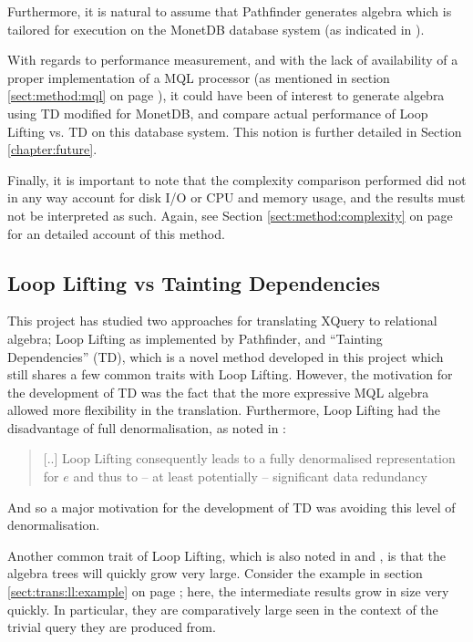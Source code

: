 Furthermore, it is natural to assume that Pathfinder generates algebra
which is tailored for execution on the MonetDB database system (as indicated
in \cite{pathfinder_purelyRelational}).

With regards to performance measurement, and with the lack of availability of a
proper implementation of a MQL processor (as mentioned in section
\ref{sect:method:mql} on page \pageref{sect:method:mql}), it could have been
of interest to generate algebra using TD modified for MonetDB, and compare
actual performance of Loop Lifting vs. TD on this database system. This notion
is further detailed in Section \ref{chapter:future}.

Finally, it is important to note that the complexity comparison performed did
not in any way account for disk I/O or CPU and memory usage, and the results
must not be interpreted as such. Again, see Section \ref{sect:method:complexity} on
page \pageref{sect:method:complexity} for an detailed account of this method.

\subsection{Loop Lifting vs Tainting Dependencies}
\label{sect:disc:llvsTD}
This project has studied two approaches for translating XQuery to relational
algebra; Loop Lifting as implemented by Pathfinder, and ``Tainting
Dependencies'' (TD), which is a novel method developed in this project which
still shares a few common traits with Loop Lifting. However, the motivation for
the development of TD was the fact that the more expressive MQL algebra allowed
more flexibility in the translation. Furthermore, Loop Lifting had the
disadvantage of full denormalisation, as noted in
\cite{pathfinder_purelyRelational}: 

\begin{quote}
[..] Loop Lifting consequently leads to a fully denormalised representation for
$e$ and thus to -- at least potentially -- significant data redundancy
\end{quote}

And so a major motivation for the development of TD was avoiding this level of
denormalisation.

Another common trait of Loop Lifting, which is also noted in
\cite{pathfinder_mothertongue} and \cite{pathfinder_purelyRelational}, is that
the algebra trees will quickly grow very large. Consider the example in section 
\ref{sect:trans:ll:example} on page \pageref{sect:trans:ll:example}; here, the
intermediate results grow in size very quickly. In particular, they are
comparatively large seen in the context of the trivial query they are produced
from.

